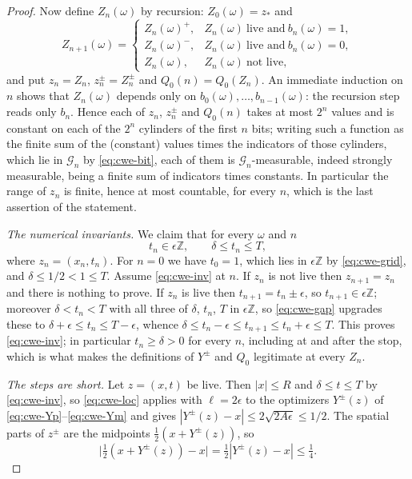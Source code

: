 \begin{proof}
Now define $Z_n(\omega)$ by recursion: $Z_0(\omega)=z_*$ and
\[
  Z_{n+1}(\omega)=\begin{cases}
    Z_n(\omega)^+,&Z_n(\omega)\ \text{live and}\ b_n(\omega)=1,\\
    Z_n(\omega)^-,&Z_n(\omega)\ \text{live and}\ b_n(\omega)=0,\\
    Z_n(\omega),&Z_n(\omega)\ \text{not live},
  \end{cases}
\]
and put $z_n=Z_n$, $z^\pm_n=Z_n^\pm$ and $Q_0(n)=Q_0(Z_n)$. An immediate
induction on $n$ shows that $Z_n(\omega)$ depends only on
$b_0(\omega),\ldots,b_{n-1}(\omega)$: the recursion step reads only $b_n$. Hence
each of $z_n$, $z^\pm_n$ and $Q_0(n)$ takes at most $2^n$ values and is constant
on each of the $2^n$ cylinders of the first $n$ bits; writing such a function as
the finite sum of the (constant) values times the indicators of those cylinders,
which lie in $\mathcal G_n$ by \eqref{eq:cwe-bit}, each of them is
$\mathcal G_n$-measurable, indeed strongly measurable, being a finite sum of
indicators times constants. In particular the range of $z_n$ is finite, hence at
most countable, for every $n$, which is the last assertion of the statement.

\emph{The numerical invariants.} We claim that for every $\omega$ and $n$
\begin{equation}\label{eq:cwe-inv}
  t_n\in\epsilon\mathbb Z,\qquad \delta\le t_n\le T,
\end{equation}
where $z_n=(x_n,t_n)$. For $n=0$ we have $t_0=1$, which lies in
$\epsilon\mathbb Z$ by \eqref{eq:cwe-grid}, and
$\delta\le1/2<1\le T$. Assume \eqref{eq:cwe-inv} at $n$. If $z_n$ is not live
then $z_{n+1}=z_n$ and there is nothing to prove. If $z_n$ is live then
$t_{n+1}=t_n\pm\epsilon$, so $t_{n+1}\in\epsilon\mathbb Z$; moreover
$\delta<t_n<T$ with all three of $\delta$, $t_n$, $T$ in $\epsilon\mathbb Z$, so
\eqref{eq:cwe-gap} upgrades these to $\delta+\epsilon\le t_n\le T-\epsilon$,
whence $\delta\le t_n-\epsilon\le t_{n+1}\le t_n+\epsilon\le T$. This proves
\eqref{eq:cwe-inv}; in particular $t_n\ge\delta>0$ for every $n$, including at
and after the stop, which is what makes the definitions of $Y^\pm$ and $Q_0$
legitimate at every $Z_n$.

\emph{The steps are short.} Let $z=(x,t)$ be live. Then $|x|\le R$ and
$\delta\le t\le T$ by \eqref{eq:cwe-inv}, so \eqref{eq:cwe-loc} applies with
$\ell=2\epsilon$ to the optimizers $Y^\pm(z)$ of
\eqref{eq:cwe-Yp}--\eqref{eq:cwe-Ym} and gives
$|Y^\pm(z)-x|\le2\sqrt{2A\epsilon}\le1/2$. The spatial parts of $z^\pm$ are the
midpoints $\tfrac12(x+Y^\pm(z))$, so
\begin{equation}\label{eq:cwe-short}
  \bigl|\tfrac12(x+Y^\pm(z))-x\bigr|=\tfrac12|Y^\pm(z)-x|\le\tfrac14 .
\end{equation}


\end{proof}
